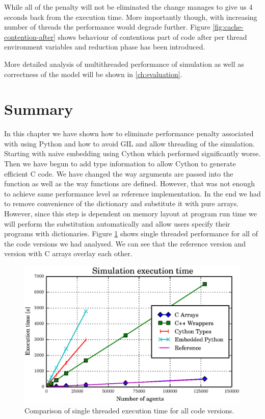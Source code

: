 \documentclass[12pt, a4paper]{report}
\begin{document}
While all of the penalty will not be eliminated the change manages to give us
4 seconds back from the execution time. More importantly though, with increasing
number of threads the performance would degrade further. Figure
\ref{fig:cache-contention-after} shows behaviour of contentious part of code
after per thread environment variables and reduction phase has been introduced.

More detailed analysis of multithreaded performance of simulation as well as
correctness of the model will be shown in \ref{ch:evaluation}.

\section{Summary}\label{sec:simple-lerm-summ}
In this chapter we have shown how to eliminate performance penalty associated
with using Python and how to avoid GIL and allow threading of the simulation.
Starting with naive embedding using Cython which performed significantly worse.
Then we have begun to add type information to allow Cython to generate efficient
C code. We have changed the way arguments are passed into the function as well
as the way functions are defined. However, that was not enough to achieve
same performance level as reference implementation. In the end we had to
remove convenience of the dictionary and substitute it with pure arrays.
However, since this step is dependent on memory layout at program run time
we will perform the substitution automatically and allow users specify
their programs with dictionaries. Figure \ref{fig:compared-single-perf} shows
single threaded performance for all of the code versions we had analysed.
We can see that the reference version and version with C arrays overlay
each other.

\begin{figure}[H]
  \begin{center}
    \includegraphics[width=\columnwidth]{graphs/compared-single-perf.eps}
    \caption{Comparison of single threaded execution time for all code versions.}
    \label{fig:compared-single-perf}
  \end{center}
\end{figure}
\end{document}

